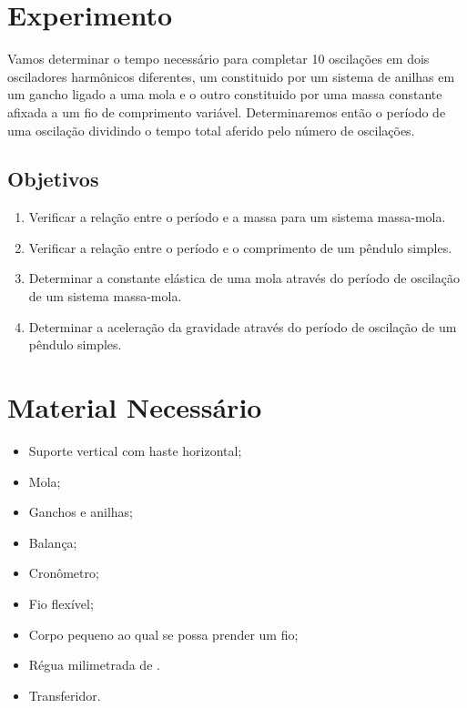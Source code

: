 \section{Experimento}

Vamos determinar o tempo necessário para completar 10 oscilações em dois osciladores harmônicos diferentes, um constituido por um sistema de anilhas em um gancho ligado a uma mola e o outro constituido por uma massa constante afixada a um fio de comprimento variável. Determinaremos então o período de uma oscilação dividindo o tempo total aferido pelo número de oscilações.

\subsection{Objetivos}
\label{Sec:ObjetivosOscilacoes}

\begin{enumerate}
	\item Verificar a relação entre o período e a massa para um sistema massa-mola.
	\item Verificar a relação entre o período e o comprimento de um pêndulo simples.
	\item Determinar a constante elástica de uma mola através do período de oscilação de um sistema massa-mola.
	\item Determinar a aceleração da gravidade através do período de oscilação de um pêndulo simples.
\end{enumerate}

\section{Material Necessário}
\begin{itemize}
	\item Suporte vertical com haste horizontal;
	\item Mola;
	\item Ganchos e anilhas;
	\item Balança;
	\item Cronômetro;
	\item Fio flexível;
	\item Corpo pequeno ao qual se possa prender um fio;
	\item Régua milimetrada de .
	\item Transferidor.
\end{itemize}


